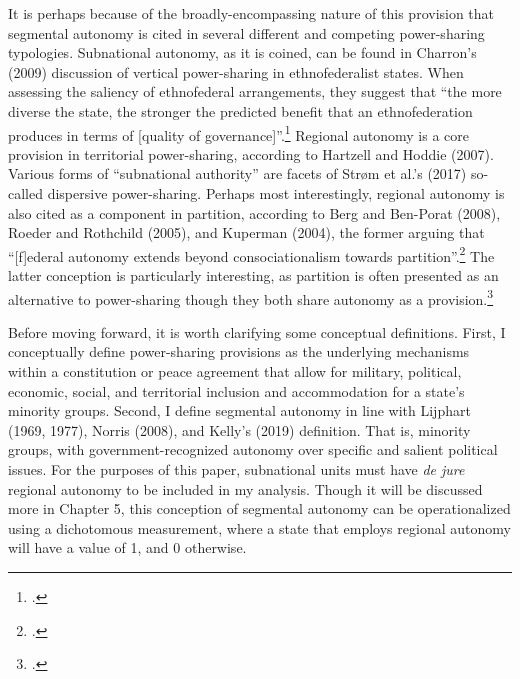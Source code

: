 \documentclass[12pt]{article}
\begin{document}
It is perhaps because of the broadly-encompassing nature of this provision that segmental autonomy is cited in several different and competing power-sharing typologies. Subnational autonomy, as it is coined, can be found in Charron’s (2009) discussion of vertical power-sharing in ethnofederalist states. When assessing the saliency of ethnofederal arrangements, they suggest that ``the more diverse the state, the stronger the predicted benefit that an ethnofederation produces in terms of [quality of governance]''.\footcite[600]{charron_government_2009} Regional autonomy is a core provision in territorial power-sharing, according to Hartzell and Hoddie (2007). Various forms of ``subnational authority'' are facets of Strøm et al.’s (2017) so-called dispersive power-sharing. Perhaps most interestingly, regional autonomy is also cited as a component in partition, according to Berg and Ben-Porat (2008), Roeder and Rothchild (2005), and Kuperman (2004), the former arguing that ``[f]ederal autonomy extends beyond consociationalism towards partition''.\footcite[33]{berg_introduction:_2008} The latter conception is particularly interesting, as partition is often presented as an alternative to power-sharing though they both share autonomy as a provision.\footcite{berg_introduction:_2008, roeder_sustainable_2003}

Before moving forward, it is worth clarifying some conceptual definitions. First, I conceptually define power-sharing provisions as the underlying mechanisms within a constitution or peace agreement that allow for military, political, economic, social, and territorial inclusion and accommodation for a state's minority groups. Second, I define segmental autonomy in line with Lijphart (1969, 1977), Norris (2008), and Kelly’s (2019) definition. That is, minority groups, with government-recognized autonomy over specific and salient political issues. For the purposes of this paper, subnational units must have \textit{de jure} regional autonomy to be included in my analysis. Though it will be discussed more in Chapter 5, this conception of segmental autonomy can be operationalized using a dichotomous measurement, where a state that employs regional autonomy will have a value of 1, and 0 otherwise. 
\end{document}
